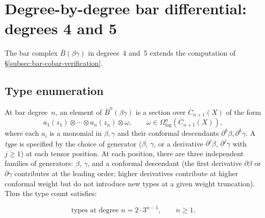 \section{Degree-by-degree bar differential: degrees 4 and 5}
\label{sec:betagamma-bar-degree45}

The bar complex $\bar{B}(\beta\gamma)$ in degrees~4 and~5 extends the computation of \S\ref{subsec:bar-cobar-verification}.

\subsection{Type enumeration}

At bar degree~$n$, an element of $\bar{B}^n(\beta\gamma)$ is a section
over $\overline{C}_{n+1}(X)$ of the form
\[
a_1(z_1) \otimes \cdots \otimes a_n(z_n) \otimes \omega,
\qquad \omega \in \Omega^n_{\log}(\overline{C}_{n+1}(X)),
\]
where each $a_i$ is a monomial in $\beta, \gamma$ and their
conformal descendants $\partial^k \beta, \partial^k \gamma$.
A \emph{type} is specified by the choice of generator
($\beta$, $\gamma$, or a derivative $\partial^j \beta$,
$\partial^j \gamma$ with $j \geq 1$) at each tensor position.
At each position, there are three independent families of
generators: $\beta$, $\gamma$, and a conformal descendant
(the first derivative $\partial \beta$ or $\partial \gamma$
contributes at the leading order; higher derivatives contribute at
higher conformal weight but do not introduce new types at a given
weight truncation). Thus the type count satisfies:

\begin{equation}\label{eq:betagamma-type-count}
\text{types at degree } n = 2 \cdot 3^{n-1}, \qquad n \geq 1.
\end{equation}


